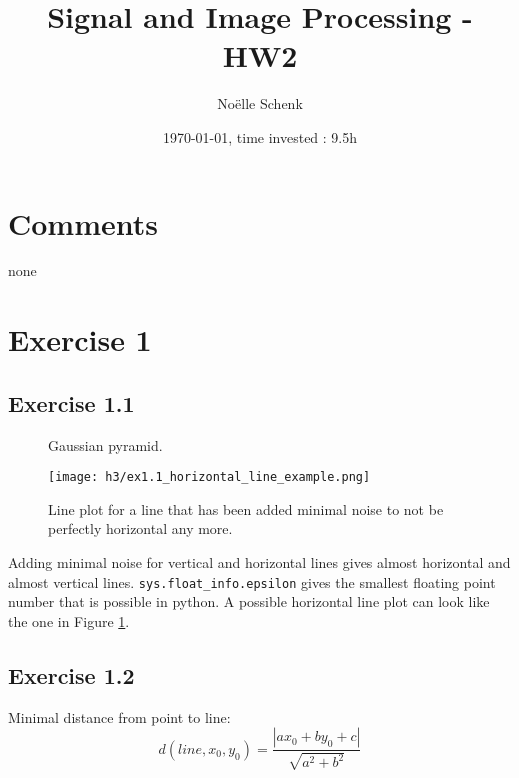 \documentclass[a4paper,8pt]{extarticle}\usepackage[]{graphicx}\usepackage[]{color}
\title{Signal and Image Processing - HW2}
\author{Noëlle Schenk}
\date{\today, time invested : 9.5h}
\begin{document}
\maketitle
\section{Comments}
none

\section{Exercise 1}
\subsection{Exercise 1.1}

\begin{figure}
  \caption{Gaussian pyramid.}
  \centering
    \texttt{[image: h3/ex1.1\_horizontal\_line\_example.png]}
  \label{fig:horizontal}
  \caption{Line plot for a line that has been added minimal noise to not be perfectly horizontal any more.}
\end{figure}

Adding minimal noise for vertical and horizontal lines gives almost horizontal and almost vertical lines. \texttt{sys.float_info.epsilon} gives the smallest floating point number that is possible in python. A possible horizontal line plot can look like the one in Figure \ref{fig:horizontal}. 

\subsection{Exercise 1.2}
Minimal distance from point to line: \[d(line, x_{0}, y_{0}) = \frac{| ax_0 + by_0 + c|}{\sqrt{a^2 + b^2}} \]


\end{document}

